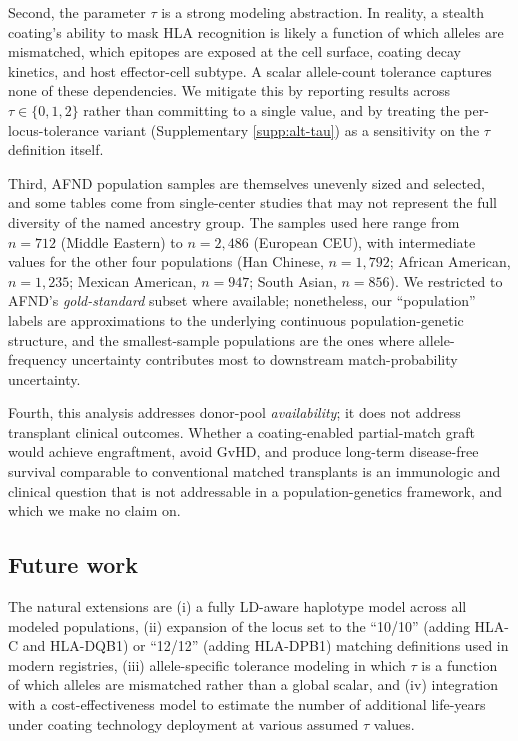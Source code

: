 \documentclass[11pt]{article}
\begin{document}
Second, the parameter $\tau$ is a strong modeling abstraction. In reality, a stealth coating's ability to mask HLA recognition is likely a function of which alleles are mismatched, which epitopes are exposed at the cell surface, coating decay kinetics, and host effector-cell subtype. A scalar allele-count tolerance captures none of these dependencies. We mitigate this by reporting results across $\tau \in \{0, 1, 2\}$ rather than committing to a single value, and by treating the per-locus-tolerance variant (Supplementary \cref{supp:alt-tau}) as a sensitivity on the $\tau$ definition itself.

Third, AFND population samples are themselves unevenly sized and selected, and some tables come from single-center studies that may not represent the full diversity of the named ancestry group. The samples used here range from $n = 712$ (Middle Eastern) to $n = 2{,}486$ (European CEU), with intermediate values for the other four populations (Han Chinese, $n = 1{,}792$; African American, $n = 1{,}235$; Mexican American, $n = 947$; South Asian, $n = 856$). We restricted to AFND's \emph{gold-standard} subset where available; nonetheless, our ``population'' labels are approximations to the underlying continuous population-genetic structure, and the smallest-sample populations are the ones where allele-frequency uncertainty contributes most to downstream match-probability uncertainty.

Fourth, this analysis addresses donor-pool \emph{availability}; it does not address transplant clinical outcomes. Whether a coating-enabled partial-match graft would achieve engraftment, avoid GvHD, and produce long-term disease-free survival comparable to conventional matched transplants is an immunologic and clinical question that is not addressable in a population-genetics framework, and which we make no claim on.

\subsection*{Future work}
The natural extensions are (i) a fully LD-aware haplotype model across all modeled populations, (ii) expansion of the locus set to the ``10/10'' (adding HLA-C and HLA-DQB1) or ``12/12'' (adding HLA-DPB1) matching definitions used in modern registries, (iii) allele-specific tolerance modeling in which $\tau$ is a function of which alleles are mismatched rather than a global scalar, and (iv) integration with a cost-effectiveness model to estimate the number of additional life-years under coating technology deployment at various assumed $\tau$ values.
\end{document}
